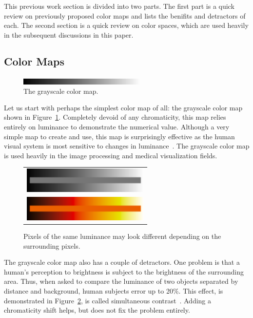 \documentclass[twocolumn]{article}
\newcommand{\lcite}[1]{~\cite{#1}}
\begin{document}
This previous work section is divided into two parts.  The first part is a
quick review on previously proposed color maps and lists the benifits and
detractors of each.  The second section is a quick review on color spaces,
which are used heavily in the subsequent discussions in this paper.

\subsection{Color Maps}
\label{sec:PreviousWork:ColorMaps}

\begin{figure}
  \centering
  \includegraphics[width=2.5in]{images/GrayscaleBar}
  \caption{The grayscale color map.}
  \label{fig:GrayscaleColorMap}
\end{figure}
Let us start with perhaps the simplest color map of all: the grayscale
color map shown in Figure~\ref{fig:GrayscaleColorMap}.  Completely devoid
of any chromaticity, this map relies entirely on luminance to demonstrate
the numerical value.  Although a very simple map to create and use, this
map is surprisingly effective as the human visual system is most sensitive
to changes in luminance\lcite{Ware04,Mullen85}.  The grayscale color map is
used heavily in the image processing and medical visualization fields.

\begin{figure}
  \centering
  \begin{tabular}{c}
    \includegraphics[width=2.5in]{images/GrayscaleLocality} \\
    \includegraphics[width=2.5in]{images/BlackBodyLocality}
  \end{tabular}
  \caption{Pixels of the same luminance may look different depending on the
    surrounding pixels.}
  \label{fig:SimultaneousContrast}
\end{figure}
The grayscale color map also has a couple of detractors.  One problem is
that a human's perception to brightness is subject to the brightness of the
surrounding area.  Thus, when asked to compare the luminance of two objects
separated by distance and background, human subjects error up to 20\%.
This effect, is demonstrated in Figure~\ref{fig:SimultaneousContrast}, is
called simultaneous contrast\lcite{Stone05}.  Adding a chromaticity shift
helps, but does not fix the problem entirely.
\end{document}
